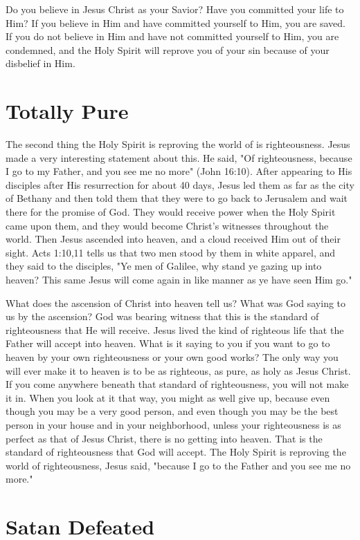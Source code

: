 Do you believe in Jesus Christ as your Savior? Have you committed your life to Him? If you believe in Him and have committed yourself to Him, you are saved. If you do not believe in Him and have not committed yourself to Him, you are condemned, and the Holy Spirit will reprove you of your sin because of your disbelief in Him. 

\section*{Totally Pure}

The second thing the Holy Spirit is reproving the world of is righteousness. Jesus made a very interesting statement about this. He said, "Of righteousness, because I go to my Father, and you see me no more" (John 16:10). After appearing to His disciples after His resurrection for about 40 days, Jesus led them as far as the city of Bethany and then told them that they were to go back to Jerusalem and wait there for the promise of God. They would receive power when the Holy Spirit came upon them, and they would become Christ's witnesses throughout the world. Then Jesus ascended into heaven, and a cloud received Him out of their sight. Acts 1:10,11 tells us that two men stood by them in white apparel, and they said to the disciples, "Ye men of Galilee, why stand ye gazing up into heaven? This same Jesus will come again in like manner as ye have seen Him go." 

What does the ascension of Christ into heaven tell us? What was God saying to us by the ascension? God was bearing witness that this is the standard of righteousness that He will receive. Jesus lived the kind of righteous life that the Father will accept into heaven. What is it saying to you if you want to go to heaven by your own righteousness or your own good works? The only way you will ever make it to heaven is to be as righteous, as pure, as holy as Jesus Christ. If you come anywhere beneath that standard of righteousness, you will not make it in. When you look at it that way, you might as well give up, because even though you may be a very good person, and even though you may be the best person in your house and in your neighborhood, unless your righteousness is as perfect as that of Jesus Christ, there is no getting into heaven. That is the standard of righteousness that God will accept. The Holy Spirit is reproving the world of righteousness, Jesus said, "because I go to the Father and you see me no more." 

\section*{Satan Defeated}

